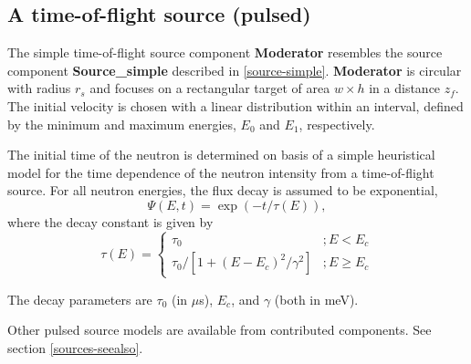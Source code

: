 \subsection*{A time-of-flight source (pulsed)}
\label{s:moderator}


The simple time-of-flight source component \textbf{Moderator} resembles
the source component \textbf{Source\_simple} described in \ref{source-simple}.
\textbf{Moderator} is circular with radius $r_s$ and focuses
on a rectangular target of area $w \times h$ in a distance $z_f$.
The initial velocity is chosen
with a linear distribution within an interval, defined by the
minimum and maximum energies, $E_0$ and $E_1$, respectively.

The initial time of the neutron is determined on basis of a
simple heuristical model for the time dependence of the
neutron intensity from a time-of-flight source.
For all neutron energies, the flux decay is assumed to be exponential,
\begin{equation}
\Psi(E,t) = \exp(-t/\tau(E)) ,
\end{equation}
where the decay constant is given by
\begin{equation}
\tau(E) = \left\{
\begin{array}{cc}
 \tau_0                               & ; E<E_c \\
 \tau_0 / [ 1 + (E-E_c)^2/\gamma^2 ]  & ; E \geq E_c
\end{array}
\right.
\end{equation}

The decay parameters are
$\tau_0$ (in $\mu$s), $E_c$, and $\gamma$ (both in meV).

Other pulsed source models are available from contributed components. See section \ref{sources-seealso}.

